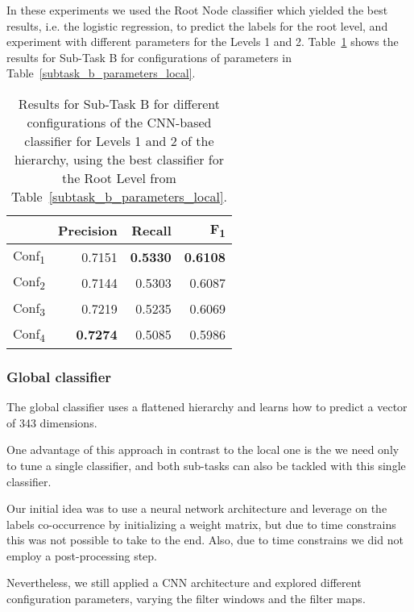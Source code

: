 \documentclass[11pt,a4paper]{article}
\begin{document}
In these experiments we used the Root Node classifier which yielded the best
results, i.e. the logistic regression, to predict the labels for the root level,
and experiment with different parameters for the Levels 1 and 2.
Table~\ref{level-1-2} shows the results for Sub-Task B for configurations of
parameters in Table~\ref{subtask_b_parameters_local}.

\begin{table}[!h]
\begin{center}
\begin{tabular}{|l|r|r|r|}
\hline\centering\textbf{}  & \textbf{Precision} &  \textbf{Recall} &  \textbf{F\textsubscript{1}}\\
\hline
Conf\textsubscript{1} & 0.7151 & \textbf{0.5330} & \textbf{0.6108} \\
Conf\textsubscript{2} & 0.7144 & 0.5303 & 0.6087 \\
Conf\textsubscript{3} & 0.7219 & 0.5235 & 0.6069 \\
Conf\textsubscript{4} & \textbf{0.7274} & 0.5085 & 0.5986 \\
\hline
\end{tabular}
\end{center}
\caption{\label{level-1-2} Results for Sub-Task B for different configurations
of the CNN-based classifier for Levels 1 and 2 of the hierarchy, using the best
classifier for the Root Level from Table~\ref{subtask_b_parameters_local}.}
\end{table}






\subsubsection{Global classifier}

The global classifier uses a flattened hierarchy and learns how to predict a
vector of 343 dimensions.

One advantage of this approach in contrast to the local one is the we need only
to tune a single classifier, and both sub-tasks can also be tackled with this
single classifier.

Our initial idea was to use a neural network architecture and leverage on the
labels co-occurrence by initializing a weight matrix, but due to time constrains
this was not possible to take to the end. Also, due to time constrains we did not
employ a post-processing step.

Nevertheless, we still applied a CNN architecture and explored different
configuration parameters, varying the filter windows and the filter maps.
\end{document}
